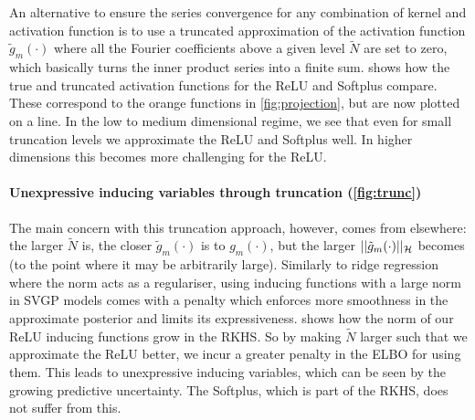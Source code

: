 An alternative to ensure the series convergence for any combination of kernel and activation function is to use a truncated approximation of the activation function $\tilde{g}_m(\cdot)$ where all the Fourier coefficients above a given level $\tilde N$ are set to zero, which basically turns the inner product series into a finite sum. %
 shows how the true and truncated activation functions for the ReLU and Softplus compare. These correspond to the orange functions in \cref{fig:projection}, but are now plotted on a line. In the low to medium dimensional regime, we see that even for small truncation levels we approximate the ReLU and Softplus well. In higher dimensions this becomes more challenging for the ReLU. %

\paragraph{Unexpressive inducing variables through truncation (\cref{fig:trunc})} The main concern with this truncation approach, however, comes from elsewhere: the larger $\tilde N$ is, the closer $\tilde{g}_m(\cdot)$ is to $g_m(\cdot)$, but the larger $\lvert\lvert \tilde{g}_m(\cdot)\rvert\rvert_{{\mathcal{H}}}$ becomes (to the point where it may be arbitrarily large). Similarly to ridge regression where the norm acts as a regulariser, using inducing functions with a large norm in SVGP models comes with a penalty which enforces more smoothness in the approximate posterior and limits its expressiveness.
 shows how the norm of our ReLU inducing functions grow in the RKHS. So by making $\tilde{N}$ larger such that we approximate the ReLU better, we incur a greater penalty in the ELBO for using them. This leads to unexpressive inducing variables, which can be seen by the growing predictive uncertainty. The Softplus, which is part of the RKHS, does not suffer from this.

